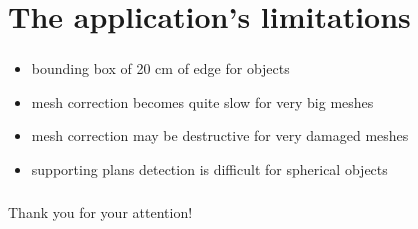 \documentclass{beamer}
\begin{document}
\section{The application's limitations}
\begin{frame}
	\frametitle{}
	\begin{block}{}
    \begin{itemize}
    \item bounding box of 20 cm of edge for objects
    \item mesh correction becomes quite slow for very big meshes
    \item mesh correction may be destructive for very damaged meshes
    \item supporting plans detection is difficult for spherical objects 
    \end{itemize}
    \end{block}
\end{frame}

\begin{frame}
	\frametitle{}

    \begin{center}
    \Large{Thank you for your attention!}
    \end{center}
\end{frame}
	
\end{document}
